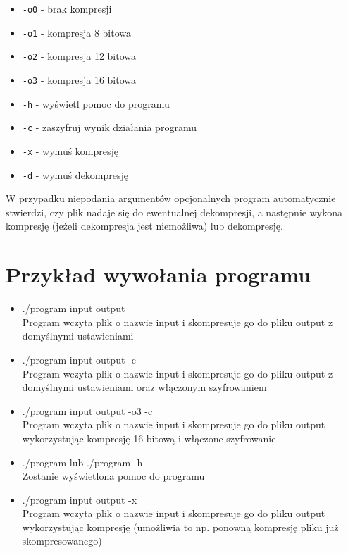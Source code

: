 \documentclass[]{article}
\begin{document}
\begin{itemize}
\item
  \texttt{-o0} - brak kompresji
\item
   \texttt{-o1} - kompresja 8 bitowa
\item
   \texttt{-o2} - kompresja 12 bitowa
\item
   \texttt{-o3} - kompresja 16 bitowa
\item
 \texttt{-h} - wyświetl pomoc do programu
\item
 \texttt{-c} - zaszyfruj wynik działania programu
\item
 \texttt{-x} - wymuś kompresję
\item
 \texttt{-d} - wymuś dekompresję
\end{itemize}
W przypadku niepodania argumentów opcjonalnych program automatycznie stwierdzi, czy plik nadaje się do ewentualnej dekompresji, a następnie wykona kompresję (jeżeli dekompresja jest niemożliwa) lub dekompresję.

\section{Przykład wywołania programu}\label{header-n233}

\begin{itemize}
\item
 ./program input output
\\Program wczyta plik o nazwie input i skompresuje go do pliku output z domyślnymi ustawieniami
\item
 ./program input output -c
\\Program wczyta plik o nazwie input i skompresuje go do pliku output z domyślnymi ustawieniami oraz włączonym szyfrowaniem
\item
 ./program input output -o3 -c
\\Program wczyta plik o nazwie input i skompresuje go do pliku output wykorzystując kompresję 16 bitową i włączone szyfrowanie 
\item
 ./program lub ./program -h
\\Zostanie wyświetlona pomoc do programu
\item
 ./program input output -x
\\Program wczyta plik o nazwie input i skompresuje go do pliku output wykorzystując kompresję (umożliwia to np. ponowną kompresję pliku już skompresowanego)

\end{itemize}
\end{document}
